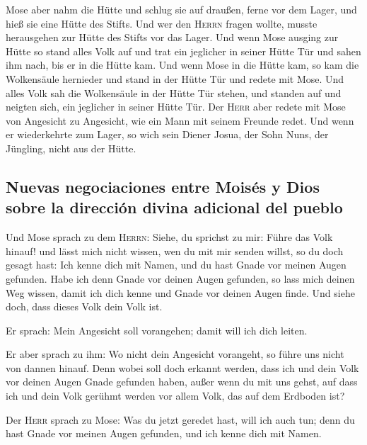  Mose aber nahm die Hütte und schlug sie auf draußen,
ferne vor dem Lager, und hieß sie eine Hütte des Stifts. Und wer den
\textsc{Herrn} fragen wollte, musste herausgehen zur Hütte des Stifts
vor das Lager.  Und wenn Mose ausging zur Hütte so stand
alles Volk auf und trat ein jeglicher in seiner Hütte Tür und sahen ihm
nach, bis er in die Hütte kam.  Und wenn Mose in die Hütte
kam, so kam die Wolkensäule hernieder und stand in der Hütte Tür und
redete mit Mose.  Und alles Volk sah die Wolkensäule in
der Hütte Tür stehen, und standen auf und neigten sich, ein jeglicher in
seiner Hütte Tür.  Der \textsc{Herr} aber redete mit Mose
von Angesicht zu Angesicht, wie ein Mann mit seinem Freunde redet. Und
wenn er wiederkehrte zum Lager, so wich sein Diener Josua, der Sohn
Nuns, der Jüngling, nicht aus der Hütte.

\hypertarget{nuevas-negociaciones-entre-moisuxe9s-y-dios-sobre-la-direcciuxf3n-divina-adicional-del-pueblo}{%
\subsection{Nuevas negociaciones entre Moisés y Dios sobre la dirección
divina adicional del
pueblo}\label{nuevas-negociaciones-entre-moisuxe9s-y-dios-sobre-la-direcciuxf3n-divina-adicional-del-pueblo}}

 Und Mose sprach zu dem \textsc{Herrn}: Siehe, du
sprichst zu mir: Führe das Volk hinauf! und lässt mich nicht wissen, wen
du mit mir senden willst, so du doch gesagt hast: Ich kenne dich mit
Namen, und du hast Gnade vor meinen Augen gefunden.  Habe
ich denn Gnade vor deinen Augen gefunden, so lass mich deinen Weg
wissen, damit ich dich kenne und Gnade vor deinen Augen finde. Und siehe
doch, dass dieses Volk dein Volk ist.

 Er sprach: Mein Angesicht soll vorangehen; damit will
ich dich leiten.

 Er aber sprach zu ihm: Wo nicht dein Angesicht
vorangeht, so führe uns nicht von dannen hinauf.  Denn
wobei soll doch erkannt werden, dass ich und dein Volk vor deinen Augen
Gnade gefunden haben, außer wenn du mit uns gehst, auf dass ich und dein
Volk gerühmt werden vor allem Volk, das auf dem Erdboden ist?

 Der \textsc{Herr} sprach zu Mose: Was du jetzt geredet
hast, will ich auch tun; denn du hast Gnade vor meinen Augen gefunden,
und ich kenne dich mit Namen.

